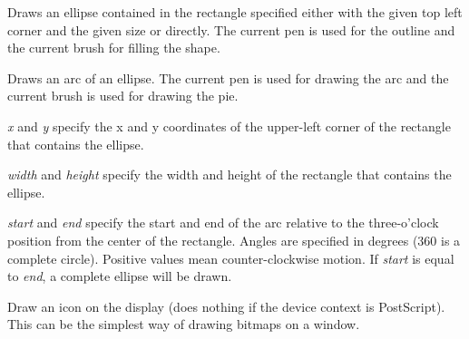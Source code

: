 


Draws an ellipse contained in the rectangle specified either with the given top
left corner and the given size or directly. The current pen is used for the
outline and the current brush for filling the shape.




\label{wxdcdrawellipticarc}


Draws an arc of an ellipse. The current pen is used for drawing the arc and
the current brush is used for drawing the pie.

{\it x} and {\it y} specify the x and y coordinates of the upper-left corner of the rectangle that contains
the ellipse.

{\it width} and {\it height} specify the width and height of the rectangle that contains
the ellipse.

{\it start} and {\it end} specify the start and end of the arc relative to the three-o'clock
position from the center of the rectangle. Angles are specified
in degrees (360 is a complete circle). Positive values mean
counter-clockwise motion. If {\it start} is equal to {\it end}, a
complete ellipse will be drawn.


\label{wxdcdrawicon}


Draw an icon on the display (does nothing if the device context is PostScript).
This can be the simplest way of drawing bitmaps on a window.


\label{wxdcdrawlabel}


